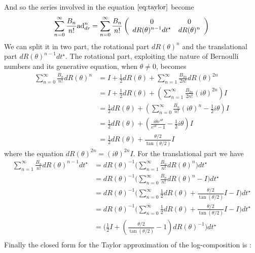 And so the series involved in the equation $\ref{eq:taylor}$ become
\begin{align*}
\sum_{n=0}^{\infty} \frac{B_{n}}{n!} \text{ad}_{dr}^{ n} 
=
\sum_{n=0}^{\infty} \frac{B_{n}}{n!} \left (
\begin{array} {c c}
0            &  0        \\
dR(\theta)^{n-1}dt^{\star}      &  dR(\theta)^{n}      
\end{array}
\right ) 
\end{align*}
We can split it in two part, the rotational part $dR(\theta)^{n}$ and the translational part $dR(\theta)^{n-1}dt^{\star}$. The rotational part, exploiting the nature of Bernoulli numbers and its generative equation, when $\theta \neq 0$, becomes
\begin{align*}
\sum_{n=0}^{\infty} \frac{B_{n}}{n!} dR(\theta)^{n}  
&=
I + \frac{1}{2}dR(\theta) + \sum_{n=1}^{\infty}\frac{B_{2n}}{2n!} dR(\theta)^{2n}  \\
&=
I + \frac{1}{2}dR(\theta) + (\sum_{n=1}^{\infty}\frac{B_{2n}}{2n!} (i \theta)^{2n})I  \\
&=
\frac{1}{2}dR(\theta) + (\sum_{n=0}^{\infty}\frac{B_{n}}{n!}(i \theta)^{n} - \frac{1}{2} i\theta) I  \\
&=
\frac{1}{2}dR(\theta) + (\frac{i\theta e^{i\theta}}{e^{i\theta} - 1} - \frac{1}{2} i\theta) I  \\
&=
\frac{1}{2}dR(\theta) +  \frac{\theta /2}{\tan(\theta/2)} I  
\end{align*}
where the equation $dR(\theta)^{2n} =  (i \theta)^{2n}I  $. For the translational part we have
\begin{align*}
\sum_{n=1}^{\infty} \frac{B_{n}}{n!} dR(\theta)^{n-1} dt^{\star} 
&=
dR(\theta)^{-1} \Big(\sum_{n=1}^{\infty}\frac{B_{n}}{n!} dR(\theta)^{n}\Big)dt^{\star} \\
&=
dR(\theta)^{-1}  \Big(\sum_{n=0}^{\infty}\frac{B_{n}}{n!} dR(\theta)^{n} - I \Big)dt^{\star}  \\
&=
dR(\theta)^{-1}  \Big(\sum_{n=0}^{\infty} \frac{1}{2}dR(\theta) +  \frac{\theta /2}{\tan(\theta/2)} I  - I \Big) dt^{\star} \\ 
&=
dR(\theta)^{-1}  \Big(\sum_{n=0}^{\infty} \frac{1}{2}dR(\theta) +  \frac{\theta /2}{\tan(\theta/2)} I  - I \Big)dt^{\star} \\
&=
\Big(\frac{1}{2} I + (\frac{\theta /2}{\tan(\theta/2)} - 1)dR(\theta)^{-1}   \Big) dt^{\star}    \\
\end{align*}
Finally the closed form for the Taylor approximation of the log-composition is \cite{vercauteren2014preprint}:
